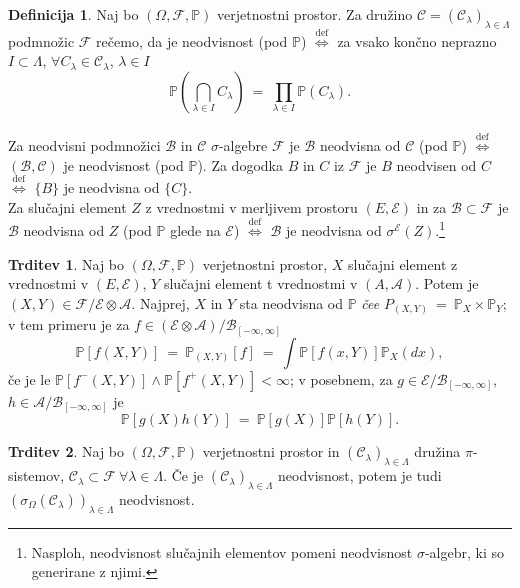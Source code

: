 \documentclass[11pt]{article}
\renewcommand{\P}{\mathbb{P}}
\newcommand{\A}{\mathcal{A}}
\newcommand{\B}{\mathcal{B}}
\newcommand{\C}{\mathcal{C}}
\newcommand{\F}{\mathcal{F}}
\newcommand{\BB}{\mathscr{B}}
\newcommand{\CC}{\mathscr{C}}
\newcommand{\EE}{\mathcal{E}}
\newcommand{\diff}{\overset{\text{def}}{\iff}}
\newcommand{\set}[1]{\{#1\}}
\newcommand{\oklepaj}[1]{\left(#1\right)}
\newcommand{\1}{\mathbbm{1}}
\newcommand{\rr}{[-\infty,\infty]}
\theoremstyle{definition}
\newtheorem{definicija}{Definicija}[section]
\theoremstyle{definition}
\newtheorem{trditev}{Trditev}[section]
\theoremstyle{definition}
\theoremstyle{definition}
\begin{document}
\begin{definicija}

Naj bo $(\Omega, \F, \P)$ verjetnostni prostor. Za družino $\C=(\C_\lambda)_{\lambda\in\Lambda}$ podmnožic $\F$ rečemo, da je neodvisnost (pod $\P$) $\diff$ za vsako končno neprazno $I \subset \Lambda$, $\forall C_\lambda \in \C_\lambda$, $\lambda \in I$
$$\P\oklepaj{\bigcap_{\lambda \in I} C_\lambda} ~=~ \prod_{\lambda \in I} \P(C_\lambda).$$\\

Za neodvisni podmnožici $\BB$ in $\CC$ $\sigma$-algebre $\F$ je $\BB$ neodvisna od $\CC$ (pod $\P$) $\diff$ $(\BB,\CC)$ je neodvisnost (pod $\P$). Za dogodka $B$ in $C$ iz $\F$ je $B$ neodvisen od $C$ $\diff$ $\set{B}$ je neodvisna od $\set{C}$. \\

Za slučajni element $Z$ z vrednostmi v merljivem prostoru $(E,\EE)$ in za $\BB \subset \F$ je $\BB$ neodvisna od $Z$ (pod $\P$ glede na $\EE$) $\diff$ $\BB$ je neodvisna od $\sigma^\EE(Z)$.\footnote{Nasploh, neodvisnost slučajnih elementov pomeni neodvisnost $\sigma$-algebr, ki so generirane z njimi.}

\end{definicija}
\vspace{0.5cm}

\begin{trditev}

Naj bo $(\Omega, \F, \P)$ verjetnostni prostor, $X$ slučajni element z vrednostmi v $(E, \EE)$, $Y$ slučajni element t vrednostmi v $(A, \A)$. Potem je $(X,Y) \in \F/\EE\otimes\A$. Najprej, $X$ in $Y$ sta neodvisna od $\P$ \textit{čee} \hbox{$P_{(X,Y)} ~=~ \P_X \times \P_Y$};
v tem primeru je za $f \in (\EE \otimes \A)/\B_{\rr}$
$$\P[f(X,Y)] ~=~ \P_{(X,Y)}[f] ~=~ \int \P[f(x,Y)]\P_X(dx),$$
če je le $\P[f^-(X,Y)] \wedge \P[f^+(X,Y)] < \infty$; v posebnem, za $g \in \EE/\B_{\rr}$, $h \in \A/\B_{\rr}$ je
$$\P[g(X)h(Y)] ~=~ \P[g(X)]\P[h(Y)].$$

\end{trditev}
\vspace{0.5cm}

\begin{trditev}

Naj bo $(\Omega, \F, \P)$ verjetnostni prostor in $(\C_\lambda)_{\lambda \in \Lambda}$ družina $\pi$-sistemov, $\C_\lambda \subset \F ~\forall \lambda \in \Lambda$. Če je $(\C_\lambda)_{\lambda \in \Lambda}$ neodvisnost, potem je tudi $(\sigma_\Omega(\C_\lambda))_{\lambda\in\Lambda}$ neodvisnost.

\end{trditev}
\vspace{0.5cm}
\end{document}
